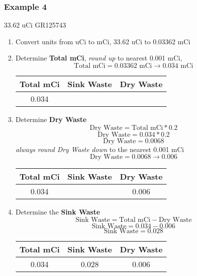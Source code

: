 \documentclass[12pt, letterpaper]{article}
\begin{document}
\FloatBarrier

\subsubsection{Example 4}
33.62 uCi GR125743
\begin{enumerate}
    \item Convert units from uCi to mCi, 33.62 uCi to 0.03362 mCi
    \item Determine \textbf{Total mCi}, \emph{round up} to nearest 0.001 mCi,
    \[ \text{Total mCi} = 0.03362 \text{ mCi}  \rightarrow 0.034 \text{ mCi} \]
    \begin{table}[ht]
        \centering
        \begin{tabular}{|c|c|c|}
            \hline
            \textbf{Total mCi} & \textbf{Sink Waste} & \textbf{Dry Waste} \\
            \hline
            0.034 &  &  \\
            \hline
        \end{tabular}
    \end{table}
    \item Determine \textbf{Dry Waste}
    \[ \text{Dry Waste} = \text{Total mCi} * 0.2 \]
    \[ \text{Dry Waste} = 0.034 * 0.2 \]
    \[ \text{Dry Waste} = 0.0068 \]
    \emph{always round Dry Waste down} to the nearest 0.001 mCi
    \[ \text{Dry Waste} = 0.0068 \rightarrow 0.006 \]
    \begin{table}[ht]
        \centering
        \begin{tabular}{|c|c|c|}
            \hline
            \textbf{Total mCi} & \textbf{Sink Waste} & \textbf{Dry Waste} \\
            \hline
            0.034 & & 0.006 \\
            \hline
        \end{tabular}
    \end{table}
    \item Determine the \textbf{Sink Waste}
    \[ \text{Sink Waste} = \text{Total mCi} - \text{Dry Waste} \]
    \[ \text{Sink Waste} = 0.034 - 0.006 \]
    \[ \text{Sink Waste} = 0.028 \]
    \begin{table}[ht]
        \centering
        \begin{tabular}{|c|c|c|}
            \hline
            \textbf{Total mCi} & \textbf{Sink Waste} & \textbf{Dry Waste} \\
            \hline
            0.034 & 0.028 & 0.006 \\
            \hline
        \end{tabular}
    \end{table}
\end{enumerate}
\end{document}
